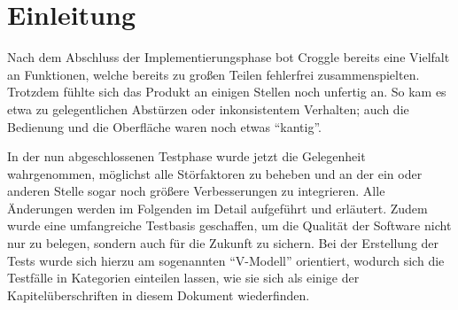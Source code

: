 \chapter{Einleitung}
Nach dem Abschluss der Implementierungsphase bot Croggle bereits eine Vielfalt an Funktionen, welche bereits zu großen Teilen fehlerfrei zusammenspielten.
Trotzdem fühlte sich das Produkt an einigen Stellen noch unfertig an.
So kam es etwa zu gelegentlichen Abstürzen oder inkonsistentem Verhalten; auch die Bedienung und die Oberfläche waren noch etwas "`kantig"'.


In der nun abgeschlossenen Testphase wurde jetzt die Gelegenheit wahrgenommen, möglichst alle Störfaktoren zu beheben und an der ein oder anderen Stelle sogar noch größere Verbesserungen zu integrieren.
Alle Änderungen werden im Folgenden im Detail aufgeführt und erläutert.
Zudem wurde eine umfangreiche Testbasis geschaffen, um die Qualität der Software nicht nur zu belegen, sondern auch für die Zukunft zu sichern.
Bei der Erstellung der Tests wurde sich hierzu am sogenannten "`V-Modell"' orientiert, wodurch sich die Testfälle in Kategorien einteilen lassen, wie sie sich als einige der Kapitelüberschriften in diesem Dokument wiederfinden.
